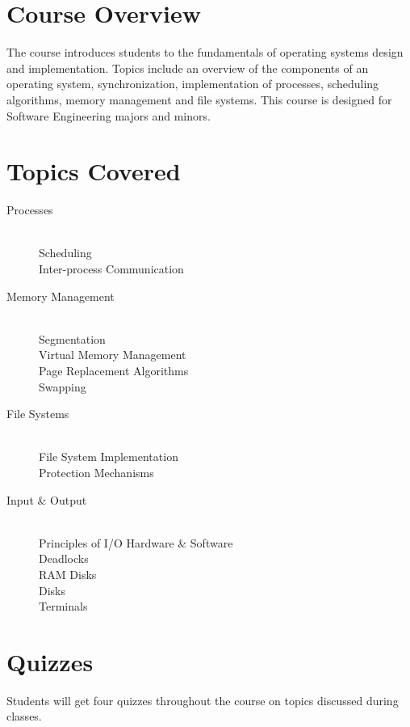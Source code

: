 \documentclass[12pt,a4paper,oneside]{article}
\begin{document}
    \section{Course Overview}

        The course introduces students to the fundamentals of operating systems
        design and implementation. Topics include an overview of the components
        of an operating system, synchronization, implementation of processes,
        scheduling algorithms, memory management and file systems. This course
        is designed for Software Engineering majors and minors.

    \section{Topics Covered}

        \begin{description}
            \item[Processes]\hfill\\
                Scheduling\\
                Inter-process Communication
            \item[Memory Management]\hfill\\
                Segmentation\\
                Virtual Memory Management\\
                Page Replacement Algorithms\\
                Swapping
            \item[File Systems]\hfill\\
                File System Implementation\\
                Protection Mechanisms
            \item[Input \& Output]\hfill\\
                Principles of I/O Hardware \& Software\\
                Deadlocks\\
                RAM Disks\\
                Disks\\
                Terminals
        \end{description}

    \section{Quizzes}

        Students will get four quizzes throughout the course on topics discussed
        during classes.
\end{document}

